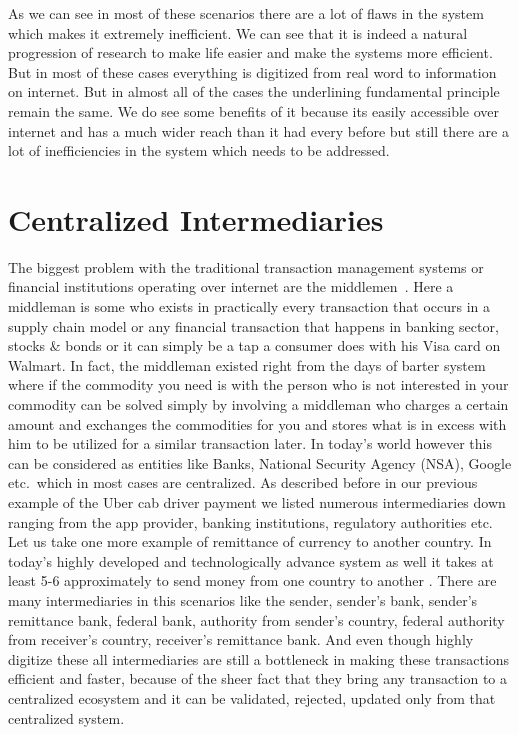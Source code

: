 As we can see in most of these scenarios there are a lot of flaws in
the system which makes it extremely inefficient. We can see that it is
indeed a natural progression of research to make life easier and make
the systems more efficient. But in most of these cases everything is
digitized from real word to information on internet. But in almost all
of the cases the underlining fundamental principle remain the same. We
do see some benefits of it because its easily accessible over internet
and has a much wider reach than it had every before but still there
are a lot of inefficiencies in the system which needs to be addressed.


\section{Centralized Intermediaries}

The biggest problem with the traditional transaction management
systems or financial institutions operating over internet are the
middlemen~\cite{torres10}. Here a middleman is some who exists in
practically every transaction that occurs in a supply chain model or
any financial transaction that happens in banking sector, stocks \&
bonds or it can simply be a tap a consumer does with his Visa card on
Walmart. In fact, the middleman existed right from the days of barter
system where if the commodity you need is with the person who is not
interested in your commodity can be solved simply by involving a
middleman who charges a certain amount and exchanges the commodities
for you and stores what is in excess with him to be utilized for a
similar transaction later. In today's world however this can be
considered as entities like Banks, National Security Agency (NSA), Google
etc.\ which in most cases are centralized. As described before in our
previous example of the Uber cab driver payment we listed numerous
intermediaries down ranging from the app provider, banking
institutions, regulatory authorities etc. Let us take one more example
of remittance of currency to another country. In today's highly
developed and technologically advance system as well it takes at least
5-6 approximately to send money from one country to another
\cite{martinez11}. There are many intermediaries in this scenarios
like the sender, sender's bank, sender's remittance bank, federal
bank, authority from sender's country, federal authority from
receiver's country, receiver's remittance bank. And even though highly
digitize these all intermediaries are still a bottleneck in making
these transactions efficient and faster, because of the sheer fact
that they bring any transaction to a centralized ecosystem and it can
be validated, rejected, updated only from that centralized system.

